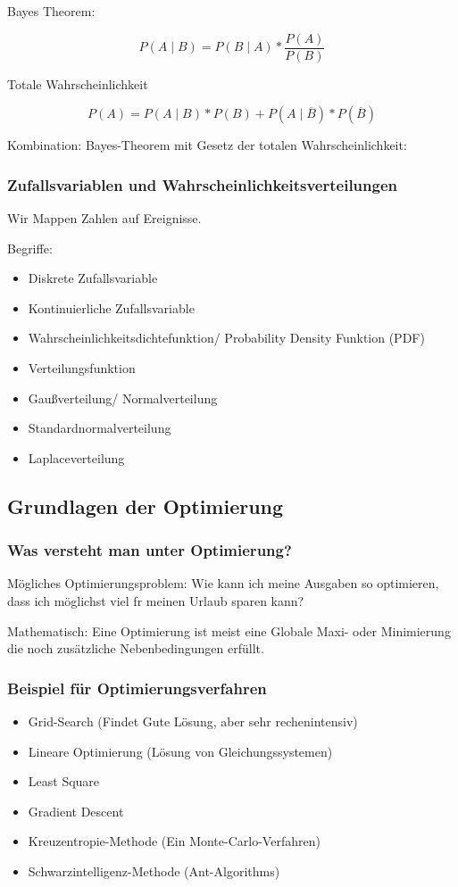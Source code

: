 \documentclass[a4paper]{article}
\begin{document}
Bayes Theorem:

$$P(A\mid B) = P(B\mid A) * \frac{P(A)}{P(B)}$$

Totale Wahrscheinlichkeit

$$P(A) = P(A\mid B) * P(B) + P(A\mid \overline{B}) * P(\overline{B})$$

Kombination: Bayes-Theorem mit Gesetz der totalen Wahrscheinlichkeit:


\subsubsection{Zufallsvariablen und Wahrscheinlichkeitsverteilungen}

Wir Mappen Zahlen auf Ereignisse.

Begriffe:

\begin{itemize}
    \item Diskrete Zufallsvariable
    \item Kontinuierliche Zufallsvariable
    \item Wahrscheinlichkeitsdichtefunktion/ Probability Density Funktion (PDF)
    \item Verteilungsfunktion
    \item Gaußverteilung/ Normalverteilung
    \item Standardnormalverteilung
    \item Laplaceverteilung
\end{itemize}

\subsection{Grundlagen der Optimierung}

\subsubsection{Was versteht man unter Optimierung?}

Mögliches Optimierungsproblem: Wie kann ich meine Ausgaben so optimieren, dass ich möglichst viel fr meinen Urlaub sparen kann?

Mathematisch: Eine Optimierung ist meist eine Globale Maxi- oder Minimierung die noch zusätzliche Nebenbedingungen erfüllt.

\subsubsection{Beispiel für Optimierungsverfahren}

\begin{itemize}
    \item Grid-Search (Findet Gute Lösung, aber sehr rechenintensiv)
    \item Lineare Optimierung (Lösung von Gleichungssystemen)
    \item Least Square
    \item Gradient Descent
    \item Kreuzentropie-Methode (Ein Monte-Carlo-Verfahren)
    \item Schwarzintelligenz-Methode (Ant-Algorithms)
\end{itemize}
\end{document}
